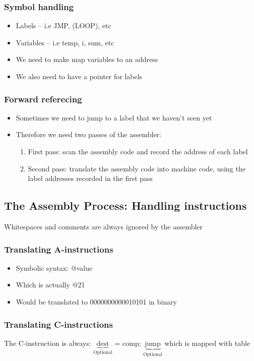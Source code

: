 \documentclass[12pt,a4paper]{article}
\begin{document}
\subsubsection{Symbol handling}
\begin{itemize}
    \item Labels -- i.e JMP, (LOOP), etc
    \item Variables -- i.e temp, i, sum, etc
    \item We need to make map variables to an address
    \item We also need to have a pointer for labels
\end{itemize}

\subsubsection{Forward referecing}
\begin{itemize}
    \item Sometimes we need to jump to a label that we haven't seen yet
    \item Therefore we need two passes of the assembler:
    \begin{enumerate}
        \item First pass: scan the assembly code and record the address of each label
        \item Second pass: translate the assembly code into machine code, using the label addresses recorded in the first pass
    \end{enumerate} 
\end{itemize}

\subsection{The Assembly Process: Handling instructions}
Whitespaces and comments are always ignored by the assembler
\subsubsection{Translating A-instructions}
\begin{itemize}
    \item Symbolic syntax: @value
    \item Which is actually @21
    \item Would be translated to 0000000000010101 in binary
\end{itemize}

\subsubsection{Translating C-instructions}
The C-instruction is always: $\underbrace{\text{dest}}_{\text{Optional}}$ = comp; $\underbrace{\text{jump}}_{\text{Optional}}$ 
which is mapped with table
\end{document}
